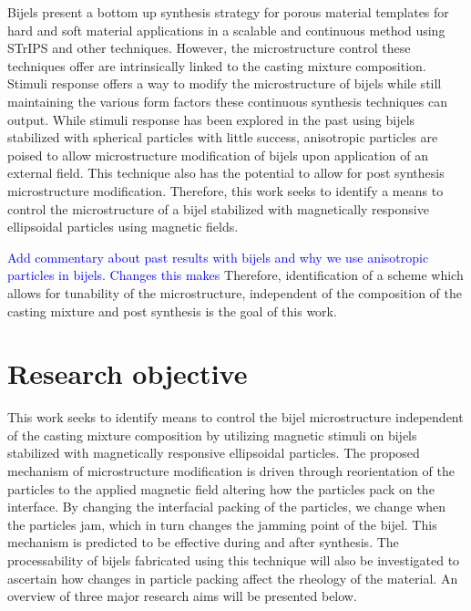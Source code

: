 Bijels present a bottom up synthesis strategy for porous material templates for hard and soft material applications in a scalable and 
continuous method using STrIPS and other techniques. However, the microstructure control these techniques offer are intrinsically linked 
to the casting mixture composition. Stimuli response offers a way to modify the microstructure of bijels while still maintaining the 
various form factors these continuous synthesis techniques can output. While stimuli response has been explored in the past using bijels 
stabilized with spherical particles with little success, anisotropic particles are poised to allow microstructure modification of bijels 
upon application of an external field. This technique also has the potential to allow for post synthesis microstructure modification. 
Therefore, this work seeks to identify a means to control the microstructure of a bijel stabilized with magnetically responsive 
ellipsoidal particles using magnetic fields.




\textcolor{blue}{Add commentary about past results with bijels and why we use anisotropic particles in bijels. Changes this makes} Therefore, 
identification of a scheme which allows for tunability of the microstructure, independent of the composition of the casting mixture and post 
synthesis is the goal of this work.

\section{Research objective}

This work seeks to identify means to control the bijel microstructure independent of the casting mixture composition by utilizing magnetic 
stimuli on bijels stabilized with magnetically responsive ellipsoidal particles. The proposed mechanism of microstructure modification is 
driven through reorientation of the particles to the applied magnetic field altering how the particles pack on the interface. By changing the 
interfacial packing of the particles, we change when the particles jam, which in turn changes the jamming point of the bijel. This mechanism is 
predicted to be effective during and after synthesis. The processability of bijels fabricated using this technique will also be investigated to 
ascertain how changes in particle packing affect the rheology of the material. An overview of three major research aims will be presented below.

